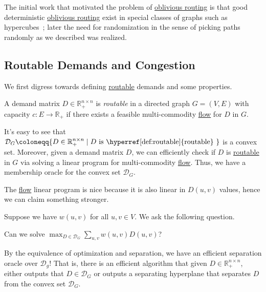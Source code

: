 The initial work that motivated the problem of \hyperref[prb:oblivious-routing]{oblivious routing} is that good deterministic \hyperref[prb:oblivious-routing]{oblivious routing} exist in special classes of graphs such as hypercubes~\cite{valiant1981universal}; later the need for randomization in the sense of picking paths randomly as we described was realized.

\subsection{Routable Demands and Congestion}
We first digress towards defining \hyperref[def:routable]{routable} demands and some properties.

\begin{definition}[Routable]\label{def:routable}
	A demand matrix \(D \in \mathbb{R} _{+}^{n \times n}\) is \emph{routable} in a directed graph \(G = (V, E)\) with capacity \(c \colon E \to \mathbb{R} _{+}\) if there exists a feasible multi-commodity \hyperref[def:flow]{flow} for \(D\) in \(G\).
\end{definition}

It's easy to see that \(\mathcal{D} _G \coloneqq \{ D \in \mathbb{R} _{+}^{n \times n} \mid D \text{ is \hyperref[def:routable]{routable} } \} \) is a convex set. Moreover, given a demand matrix \(D\), we can efficiently check if \(D\) is \hyperref[def:routable]{routable} in \(G\) via solving a linear program for multi-commodity \hyperref[def:flow]{flow}. Thus, we have a membership oracle for the convex set \(\mathcal{D} _G\).

\begin{intuition}
	The \hyperref[def:flow]{flow} linear program is nice because it is also linear in \(D(u, v)\) values, hence we can claim something stronger.
\end{intuition}

Suppose we have \(w(u, v)\) for all \(u, v \in V\). We ask the following question.

\begin{problem}\label{prb:optimize-demand-polytope}
Can we solve \(\max _{D \in \mathcal{D} _G} \sum_{u, v} w(u, v) D(u, v)\)?
\end{problem}
\begin{answer}
	By the equivalence of optimization and separation, we have an efficient separation oracle over \(\mathcal{D} _g\)! That is, there is an efficient algorithm that given \(D \in \mathbb{R} _{+}^{n \times n}\), either outputs that \(D \in \mathcal{D} _G\) or outputs a separating hyperplane that separates \(D\) from the convex set \(\mathcal{D} _G\).
\end{answer}

